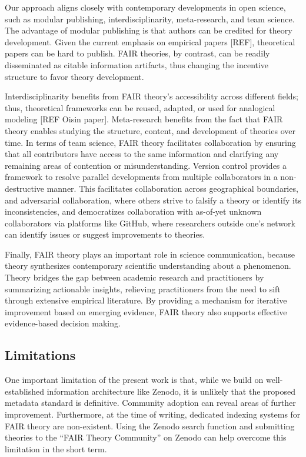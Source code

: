 \documentclass[
  man,floatsintext]{apa6}
\begin{document}
Our approach aligns closely with contemporary developments in open science,
such as modular publishing, interdisciplinarity, meta-research, and team science.
The advantage of modular publishing is that authors can be credited for theory development.
Given the current emphasis on empirical papers {[}REF{]}, theoretical papers can be hard to publish.
FAIR theories, by contrast, can be readily disseminated as citable information artifacts, thus changing the incentive structure to favor theory development.

Interdisciplinarity benefits from FAIR theory's accessibility across different fields; thus, theoretical frameworks can be reused, adapted, or used for analogical modeling {[}REF Oisin paper{]}.
Meta-research benefits from the fact that FAIR theory enables studying the structure, content, and development of theories over time.
In terms of team science, FAIR theory facilitates collaboration by ensuring that all contributors have access to the same information and
clarifying any remaining areas of contention or misunderstanding.
Version control provides a framework to resolve parallel developments from multiple collaborators in a non-destructive manner.
This facilitates collaboration across geographical boundaries,
and adversarial collaboration, where others strive to falsify a theory or identify its inconsistencies, and democratizes collaboration with as-of-yet unknown collaborators via platforms like GitHub, where researchers outside one's network can identify issues or suggest improvements to theories.

Finally, FAIR theory plays an important role in science communication, because theory synthesizes contemporary scientific understanding about a phenomenon.
Theory bridges the gap between academic research and practitioners by summarizing actionable insights, relieving practitioners from the need to sift through extensive empirical literature.
By providing a mechanism for iterative improvement based on emerging evidence, FAIR theory also supports effective evidence-based decision making.

\subsection{Limitations}\label{limitations}

One important limitation of the present work is that,
while we build on well-established information architecture like Zenodo,
it is unlikely that the proposed metadata standard is definitive.
Community adoption can reveal areas of further improvement.
Furthermore, at the time of writing, dedicated indexing systems for FAIR theory are non-existent.
Using the Zenodo search function and submitting theories to the ``FAIR Theory Community'' on Zenodo can help overcome this limitation in the short term.
\end{document}
